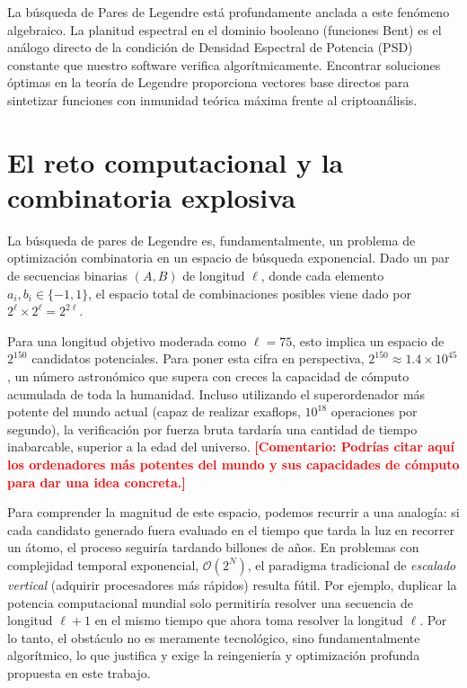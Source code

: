 \documentclass[12pt,a4paper]{tfg_domingo}
\newcommand{\Comentario}[1]{\textcolor{red}{\textbf{[Comentario:
      #1]}}}
\begin{document}
La búsqueda de Pares de Legendre está profundamente anclada a este fenómeno algebraico. La planitud espectral en el dominio booleano (funciones Bent) es el análogo directo de la condición de Densidad Espectral de Potencia (PSD) constante que nuestro software verifica algorítmicamente. Encontrar soluciones óptimas en la teoría de Legendre proporciona vectores base directos para sintetizar funciones con inmunidad teórica máxima frente al criptoanálisis.

\section{El reto computacional y la combinatoria explosiva}

La búsqueda de pares de Legendre es, fundamentalmente, un problema de
optimización combinatoria en un espacio de búsqueda exponencial. Dado
un par de secuencias binarias $(A, B)$ de longitud $\ell$, donde cada
elemento $a_i, b_i \in \{-1, 1\}$, el espacio total de combinaciones
posibles viene dado por $2^\ell \times 2^\ell = 2^{2\ell}$. 

Para una longitud objetivo moderada como $\ell=75$, esto implica un
espacio de $2^{150}$ candidatos potenciales. Para poner esta cifra en
perspectiva, $2^{150} \approx 1.4 \times 10^{45}$, un número astronómico que
supera con creces la capacidad de cómputo acumulada de toda la
humanidad. Incluso utilizando el superordenador más potente del mundo
actual (capaz de realizar exaflops, $10^{18}$ operaciones por
segundo), la verificación por fuerza bruta tardaría una cantidad de
tiempo inabarcable, superior a la edad del universo. 
\Comentario{Podrías citar aquí los ordenadores más potentes del mundo
  y sus capacidades de cómputo para dar una idea concreta.}

Para comprender la magnitud de este espacio, podemos recurrir a una
analogía: si cada candidato generado fuera evaluado en el tiempo que
tarda la luz en recorrer un átomo, el proceso seguiría tardando
billones de años. En problemas con complejidad temporal exponencial,
$\mathcal{O}(2^N)$, el paradigma tradicional de \textit{escalado vertical}
(adquirir procesadores más rápidos) resulta fútil. Por ejemplo,
duplicar la potencia computacional mundial solo permitiría resolver
una secuencia de longitud $\ell + 1$ en el mismo tiempo que ahora toma
resolver la longitud $\ell$. Por lo tanto, el obstáculo no es meramente
tecnológico, sino fundamentalmente algorítmico, lo que justifica y
exige la reingeniería y optimización profunda propuesta en este
trabajo.
\end{document}
